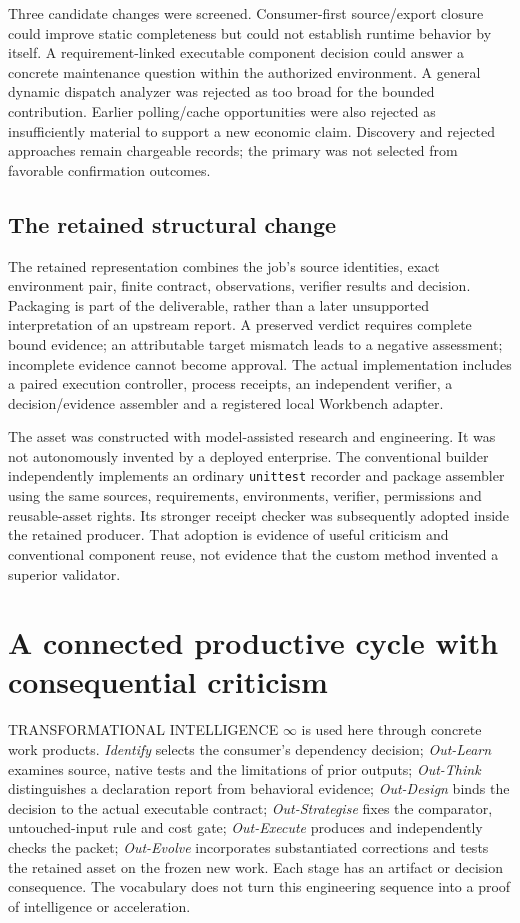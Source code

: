 \documentclass[11pt,a4paper]{article}
\newcommand{\TI}{TRANSFORMATIONAL INTELLIGENCE $\infty$}
\begin{document}
Three candidate changes were screened. Consumer-first source/export closure could improve static completeness but could not establish runtime behavior by itself. A requirement-linked executable component decision could answer a concrete maintenance question within the authorized environment. A general dynamic dispatch analyzer was rejected as too broad for the bounded contribution. Earlier polling/cache opportunities were also rejected as insufficiently material to support a new economic claim. Discovery and rejected approaches remain chargeable records; the primary was not selected from favorable confirmation outcomes.\cite{discovery}

\subsection{The retained structural change}

The retained representation combines the job's source identities, exact environment pair, finite contract, observations, verifier results and decision. Packaging is part of the deliverable, rather than a later unsupported interpretation of an upstream report. A preserved verdict requires complete bound evidence; an attributable target mismatch leads to a negative assessment; incomplete evidence cannot become approval. The actual implementation includes a paired execution controller, process receipts, an independent verifier, a decision/evidence assembler and a registered local Workbench adapter.\cite{companion}

The asset was constructed with model-assisted research and engineering. It was not autonomously invented by a deployed enterprise. The conventional builder independently implements an ordinary \texttt{unittest} recorder and package assembler using the same sources, requirements, environments, verifier, permissions and reusable-asset rights. Its stronger receipt checker was subsequently adopted inside the retained producer. That adoption is evidence of useful criticism and conventional component reuse, not evidence that the custom method invented a superior validator.\cite{controls}

\section{A connected productive cycle with consequential criticism}

\TI{} is used here through concrete work products. \emph{Identify} selects the consumer's dependency decision; \emph{Out-Learn} examines source, native tests and the limitations of prior outputs; \emph{Out-Think} distinguishes a declaration report from behavioral evidence; \emph{Out-Design} binds the decision to the actual executable contract; \emph{Out-Strategise} fixes the comparator, untouched-input rule and cost gate; \emph{Out-Execute} produces and independently checks the packet; \emph{Out-Evolve} incorporates substantiated corrections and tests the retained asset on the frozen new work. Each stage has an artifact or decision consequence. The vocabulary does not turn this engineering sequence into a proof of intelligence or acceleration.\cite{discovery,criticism,protocol}
\end{document}
